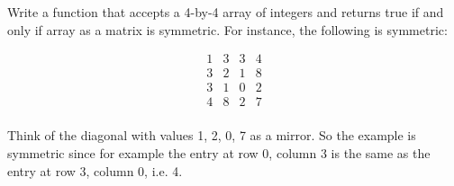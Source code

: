 \begin{ex}
Write a function that accepts a 4-by-4 array of integers and returns true if and only if array as a matrix is symmetric. For instance, the following is symmetric:

\begin{align*}
1 & 3 & 3 & 4 \\
3 & 2 & 1 & 8 \\
3 & 1 & 0 & 2 \\
4 & 8 & 2 & 7 \\
\end{align*}

Think of the diagonal with values 1, 2, 0, 7 as a mirror. So the example is symmetric since for example the entry at row 0, column 3 is the same as the entry at row 3, column 0, i.e. 4.
\end{ex}
